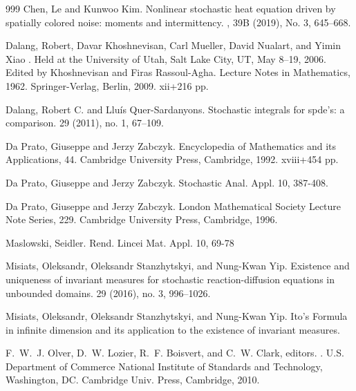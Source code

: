 \documentclass[a4paper,11pt]{article}%
\numberwithin{equation}{section}
\theoremstyle{plain}
\theoremstyle{definition}
\begin{document}
\begin{small}
\begin{thebibliography}{999}
Chen, Le and Kunwoo Kim.
\newblock Nonlinear stochastic heat equation driven by spatially colored noise: moments and intermittency.
, 39B (2019), No. 3, 645--668.

 Dalang, Robert, Davar Khoshnevisan, Carl
Mueller, David Nualart, and Yimin Xiao
.
\newblock Held at the University of Utah, Salt Lake City, UT, May 8–19, 2006.
Edited by  Khoshnevisan and Firas Rassoul-Agha. Lecture Notes in Mathematics,
1962.
\newblock Springer-Verlag, Berlin, 2009. xii+216 pp.

Dalang, Robert C. and Llu\'is Quer-Sardanyons.
\newblock Stochastic integrals for spde's: a comparison.
 29 (2011), no. 1, 67--109.

Da Prato, Giuseppe and Jerzy Zabczyk.
Encyclopedia of Mathematics and its Applications, 44. Cambridge University Press, Cambridge, 1992. xviii+454 pp.

Da Prato, Giuseppe and Jerzy Zabczyk.
Stochastic Anal. Appl. 10, 387-408.


Da Prato, Giuseppe and Jerzy Zabczyk.
\newblock London Mathematical Society Lecture Note Series, 229. Cambridge University Press, Cambridge, 1996.

Maslowski, Seidler.
\newblock Rend. Lincei Mat. Appl. 10, 69-78

Misiats, Oleksandr, Oleksandr Stanzhytskyi, and Nung-Kwan Yip.
\newblock Existence and uniqueness of invariant measures for stochastic reaction-diffusion equations in unbounded domains.
 29 (2016), no. 3, 996--1026.


Misiats, Oleksandr, Oleksandr Stanzhytskyi, and Nung-Kwan Yip.
\newblock Ito's Formula in infinite dimension and its application to the existence of invariant measures.

F.~W.~J. Olver, D.~W. Lozier, R.~F. Boisvert, and C.~W. Clark, editors.
.
\newblock U.S. Department of Commerce National Institute of Standards  and Technology, Washington, DC. Cambridge Univ. Press, Cambridge, 2010.


\end{thebibliography}
\end{small}
\end{document}
